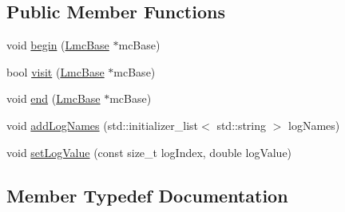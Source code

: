 \subsection*{Public Member Functions}
\begin{DoxyCompactItemize}
\item 
void \hyperlink{classnifty_1_1graph_1_1lifted__multicut_1_1PyLiftedMulticutVisitorBase_a5c19b7fc88281493bad599acd3027a37}{begin} (\hyperlink{classnifty_1_1graph_1_1lifted__multicut_1_1PyLiftedMulticutVisitorBase_ab6efa594240668fb7839c240b0a68657}{Lmc\+Base} $\ast$mc\+Base)
\item 
bool \hyperlink{classnifty_1_1graph_1_1lifted__multicut_1_1PyLiftedMulticutVisitorBase_a8f45b87596a357e5a5f3be87b48f321c}{visit} (\hyperlink{classnifty_1_1graph_1_1lifted__multicut_1_1PyLiftedMulticutVisitorBase_ab6efa594240668fb7839c240b0a68657}{Lmc\+Base} $\ast$mc\+Base)
\item 
void \hyperlink{classnifty_1_1graph_1_1lifted__multicut_1_1PyLiftedMulticutVisitorBase_abe731ca98819d42eb4dc2411ca1e1d54}{end} (\hyperlink{classnifty_1_1graph_1_1lifted__multicut_1_1PyLiftedMulticutVisitorBase_ab6efa594240668fb7839c240b0a68657}{Lmc\+Base} $\ast$mc\+Base)
\item 
void \hyperlink{classnifty_1_1graph_1_1lifted__multicut_1_1PyLiftedMulticutVisitorBase_a9259b55d9859a8c92adf2363195eb489}{add\+Log\+Names} (std\+::initializer\+\_\+list$<$ std\+::string $>$ log\+Names)
\item 
void \hyperlink{classnifty_1_1graph_1_1lifted__multicut_1_1PyLiftedMulticutVisitorBase_a81c0a1c16416714b693e53b6dafa3e3f}{set\+Log\+Value} (const size\+\_\+t log\+Index, double log\+Value)
\end{DoxyCompactItemize}


\subsection{Member Typedef Documentation}
\hypertarget{classnifty_1_1graph_1_1lifted__multicut_1_1PyLiftedMulticutVisitorBase_ae01d5c86bb86c0c59fd4742b4b31a70a}{}
